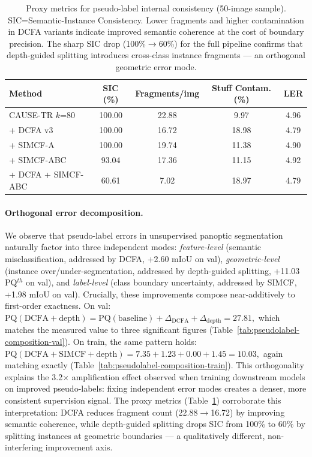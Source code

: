 \begin{table}[t]
\centering
\small
\caption{Proxy metrics for pseudo-label internal consistency (50-image sample). SIC=Semantic-Instance Consistency. Lower fragments and higher contamination in DCFA variants indicate improved semantic coherence at the cost of boundary precision. The sharp SIC drop (100\%$\to$60\%) for the full pipeline confirms that depth-guided splitting introduces cross-class instance fragments — an orthogonal geometric error mode.}
\label{tab:proxy-metrics}
\begin{tabular}{@{}lcccc@{}}
\toprule
Method & SIC (\%) & Fragments/img & Stuff Contam. (\%) & LER \\
\midrule
CAUSE-TR $k$=80 & 100.00 & 22.88 & 9.97 & 4.96 \\
+ DCFA v3 & 100.00 & 16.72 & 18.98 & 4.79 \\
+ SIMCF-A & 100.00 & 19.74 & 11.38 & 4.90 \\
+ SIMCF-ABC & 93.04 & 17.36 & 11.15 & 4.92 \\
+ DCFA + SIMCF-ABC & 60.61 & 7.02 & 18.97 & 4.79 \\
\bottomrule
\end{tabular}
\end{table}

\paragraph{Orthogonal error decomposition.}
We observe that pseudo-label errors in unsupervised panoptic segmentation naturally factor into three independent modes:
\emph{feature-level} (semantic misclassification, addressed by DCFA, +2.60 mIoU on val),
\emph{geometric-level} (instance over/under-segmentation, addressed by depth-guided splitting, +11.03 PQ$^{th}$ on val),
and \emph{label-level} (class boundary uncertainty, addressed by SIMCF, +1.98 mIoU on val).
Crucially, these improvements compose near-additively to first-order exactness.
On val:
$
\text{PQ}(\text{DCFA} + \text{depth}) = \text{PQ}(\text{baseline}) + \Delta_{\text{DCFA}} + \Delta_{\text{depth}} = 27.81,
$
which matches the measured value to three significant figures (Table~\ref{tab:pseudolabel-composition-val}).
On train, the same pattern holds:
$
\text{PQ}(\text{DCFA} + \text{SIMCF} + \text{depth}) = 7.35 + 1.23 + 0.00 + 1.45 = 10.03,
$
again matching exactly (Table~\ref{tab:pseudolabel-composition-train}).
This orthogonality explains the 3.2$\times$ amplification effect observed when training downstream models on improved pseudo-labels:
fixing independent error modes creates a denser, more consistent supervision signal.
The proxy metrics (Table~\ref{tab:proxy-metrics}) corroborate this interpretation:
DCFA reduces fragment count (22.88$\to$16.72) by improving semantic coherence,
while depth-guided splitting drops SIC from 100\% to 60\% by splitting instances at geometric boundaries —
a qualitatively different, non-interfering improvement axis.
